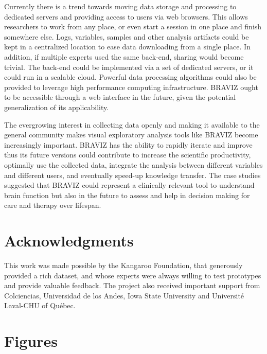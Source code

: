 \documentclass{frontiersHLTH}
\begin{document}
Currently there is a trend towards moving data storage and processing to dedicated servers and providing access to users via web browsers. This allows researchers to work from any place, or even start a session in one place and finish somewhere else. Logs, variables, samples and other analysis artifacts could be kept in a centralized location to ease data downloading from a single place. In addition, if multiple experts used the same back-end, sharing would become trivial. The back-end could be implemented via a set of dedicated servers, or it could run in a scalable cloud. Powerful data processing algorithms could also be provided to leverage high performance computing infrastructure. BRAVIZ ought to be accessible through a web interface in the future, given the potential generalization of its applicability.
  
The evergrowing interest in collecting data openly and making it available to the general community makes visual exploratory analysis tools like BRAVIZ become increasingly important. BRAVIZ has the ability to rapidly iterate and improve  thus its future versions could contribute to increase the scientific productivity, optimally use the collected data, integrate the analysis between different variables and different users, and eventually speed-up knowledge transfer. The case studies suggested that BRAVIZ could represent a clinically relevant tool to understand brain function but also in the future to assess and help in decision making for care and therapy over lifespan.
  
  
\section*{Acknowledgments}

This work was made possible by the Kangaroo Foundation, that generously provided a rich dataset, and whose experts were always willing to test prototypes and provide valuable feedback. The project also received important support from Colciencias, Universidad de los Andes, Iowa State University and Université Laval-CHU of Québec.




\section*{Figures}
\end{document}

